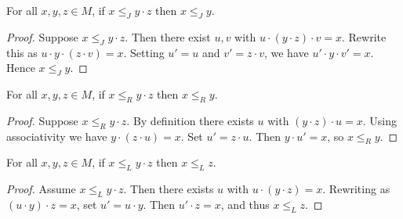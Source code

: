\begin{lemma}
\label{lem:JRel-right_cancel}
For all \(x,y,z \in M\), if \(x \le_J y \cdot z\) then \(x \le_J y\).
\leanok
{}
\end{lemma}
\begin{proof}
\leanok
Suppose \(x \le_J y \cdot z\).  Then there exist \(u,v\) with \(u \cdot (y \cdot z) \cdot v = x\).  Rewrite this as \(u \cdot y \cdot (z \cdot v) = x\).  Setting \(u' = u\) and \(v' = z \cdot v\), we have \(u' \cdot y \cdot v' = x\).  Hence \(x \le_J y\).
\end{proof}

\begin{lemma}
\label{lem:RRel-right_cancel}
For all \(x,y,z \in M\), if \(x \le_R y \cdot z\) then \(x \le_R y\).
\leanok
{}
\end{lemma}
\begin{proof}
\leanok
Suppose \(x \le_R y \cdot z\).  By definition there exists \(u\) with \((y \cdot z) \cdot u = x\).  Using associativity we have \(y \cdot (z \cdot u) = x\).  Set \(u' = z \cdot u\).  Then \(y \cdot u' = x\), so \(x \le_R y\).
\end{proof}

\begin{lemma}
\label{lem:LRel-left_cancel}
For all \(x,y,z \in M\), if \(x \le_L y \cdot z\) then \(x \le_L z\).
\leanok
{}
\end{lemma}
\begin{proof}
\leanok
Assume \(x \le_L y \cdot z\).  Then there exists \(u\) with \(u \cdot (y \cdot z) = x\).  Rewriting as \((u \cdot y) \cdot z = x\), set \(u' = u \cdot y\).  Then \(u' \cdot z = x\), and thus \(x \le_L z\).
\end{proof}
